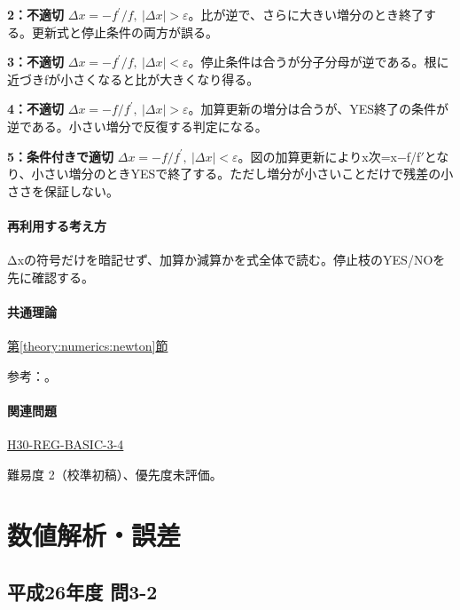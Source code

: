 \noindent\textbf{2：不適切} \(\Delta x=-f^\prime/f,\ |\Delta x|>\varepsilon\)。比が逆で、さらに大きい増分のとき終了する。更新式と停止条件の両方が誤る。\par

\noindent\textbf{3：不適切} \(\Delta x=-f^\prime/f,\ |\Delta x|<\varepsilon\)。停止条件は合うが分子分母が逆である。根に近づきfが小さくなると比が大きくなり得る。\par

\noindent\textbf{4：不適切} \(\Delta x=-f/f^\prime,\ |\Delta x|>\varepsilon\)。加算更新の増分は合うが、YES終了の条件が逆である。小さい増分で反復する判定になる。\par

\noindent\textbf{5：条件付きで適切} \(\Delta x=-f/f^\prime,\ |\Delta x|<\varepsilon\)。図の加算更新によりx次=x−f/f\ensuremath{'}となり、小さい増分のときYESで終了する。ただし増分が小さいことだけで残差の小ささを保証しない。\par

\paragraph{再利用する考え方} Δxの符号だけを暗記せず、加算か減算かを式全体で読む。停止枝のYES/NOを先に確認する。

\paragraph{共通理論} \hyperref[theory:numerics:newton]{第\ref*{theory:numerics:newton}節}

\par 参考：\cite{nist_newton}。

\paragraph{関連問題} \hyperref[q:h30-reg-basic-3-4]{H30-REG-BASIC-3-4}

\par 難易度 2（校準初稿）、優先度未評価。

\section{数値解析・誤差}

\subsection{平成26年度 問3-2}
\label{q:h26-reg-basic-3-2}

